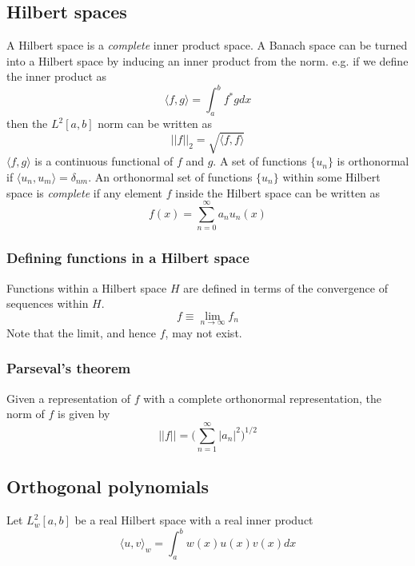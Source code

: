 \documentclass[]{article}
\begin{document}
\subsection{Hilbert spaces}
A Hilbert space is a \textit{complete} inner product space. A Banach space can be turned into a Hilbert space by inducing an inner product from the norm. e.g. if we define the inner product as
\begin{equation} \langle f, g \rangle = \int_{a}^{b} f^{*}g dx \end{equation}
then the $L^{2}[a,b]$ norm can be written as 
\begin{equation} ||f||_{2} = \sqrt{\langle f,f \rangle} \end{equation}
$\langle f, g \rangle$ is a continuous functional of $f$ and $g$.
A set of functions $\{ u_{n} \}$ is orthonormal if $\langle u_{n}, u_{m}\rangle = \delta_{nm}$. An orthonormal set of functions $\{ u_{n} \}$ within some Hilbert space is \textit{complete} if any element $f$ inside the Hilbert space can be written as 
\begin{equation} f(x) = \sum_{n=0}^{\infty} a_{n}u_{n}(x) \end{equation}
\subsubsection{Defining functions in a Hilbert space}
Functions within a Hilbert space $H$ are defined in terms of the convergence of sequences within $H$. 
\begin{equation} f \equiv \lim_{n \to \infty} f_{n} \end{equation}
Note that the limit, and hence $f$, may not exist.
\subsubsection{Parseval's theorem}
Given a representation of $f$ with a complete orthonormal representation, the norm of $f$ is given by
\begin{equation} ||f|| = \big (\sum_{n=1}^{\infty} |a_{n}|^{2} \big )^{1/2} \end{equation}
\subsection{Orthogonal polynomials}
Let $L_{w}^{2}[a,b]$ be a real Hilbert space with a real inner product
\begin{equation} \langle u,v \rangle_{w} = \int_{a}^{b} w(x)u(x)v(x)dx  \end{equation}
\end{document}
